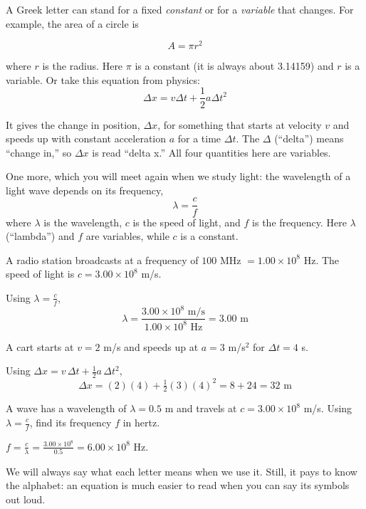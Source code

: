 A Greek letter can stand for a fixed \emph{constant} or for a \emph{variable} that changes. For example, the area of a circle is

$$A = \pi r^2$$

where $r$ is the radius. Here $\pi$ is a constant (it is always about 3.14159) and $r$ is a variable. Or take this equation from physics:
$$\Delta x = v \Delta t + \frac{1}{2} a \Delta t^2$$

It gives the change in position, $\Delta x$, for something that starts at velocity $v$ and speeds up with constant acceleration $a$ for a time $\Delta t$. The $\Delta$ (``delta'') means ``change in,'' so $\Delta x$ is read ``delta x.'' All four quantities here are variables.

One more, which you will meet again when we study light: the wavelength of a light wave depends on its frequency,
$$\lambda = \frac{c}{f}$$
where $\lambda$ is the wavelength, $c$ is the speed of light, and $f$ is the frequency. Here $\lambda$ (``lambda'') and $f$ are variables, while $c$ is a constant.

\begin{Worked}
\begin{Problem}
A radio station broadcasts at a frequency of $100$ MHz $= 1.00 \times 10^8$ Hz. The speed of light is $c = 3.00 \times 10^8$ m/s.
\end{Problem}
\begin{Solution}
Using $\lambda = \frac{c}{f}$,
$$\lambda = \frac{3.00 \times 10^8 \text{ m/s}}{1.00 \times 10^8 \text{ Hz}} = 3.00 \text{ m}$$
\end{Solution}
\end{Worked}

\begin{Worked}
\begin{Problem}
A cart starts at $v = 2$ m/s and speeds up at $a = 3$ m/s$^2$ for $\Delta t = 4$ s.
\end{Problem}
\begin{Solution}
Using $\Delta x = v\,\Delta t + \frac{1}{2} a\,\Delta t^2$,
$$\Delta x = (2)(4) + \tfrac{1}{2}(3)(4)^2 = 8 + 24 = 32 \text{ m}$$
\end{Solution}
\end{Worked}

\begin{Exercise}[title={Using Greek Symbols}, label=greek1]
A wave has a wavelength of $\lambda = 0.5$ m and travels at $c = 3.00 \times 10^8$ m/s. Using $\lambda = \frac{c}{f}$, find its frequency $f$ in hertz.
\end{Exercise}
\begin{Answer}[ref=greek1]
$f = \frac{c}{\lambda} = \frac{3.00 \times 10^8}{0.5} = 6.00 \times 10^8$ Hz.
\end{Answer}

We will always say what each letter means when we use it. Still, it pays to know the alphabet: an equation is much easier to read when you can say its symbols out loud.